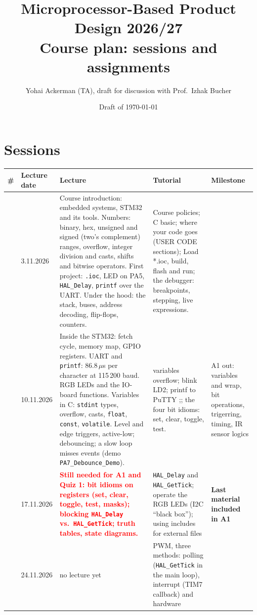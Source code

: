 \documentclass[11pt,a4paper]{article}
\title{Microprocessor-Based Product Design 2026/27\\[2pt]\large Course plan: sessions and assignments}
\author{Yohai Ackerman (TA), draft for discussion with Prof.\ Izhak Bucher}
\date{Draft of \today}
\begin{document}
\maketitle

\section{Sessions}

\noindent
\begin{xltabular}{\textwidth}{@{}c l L L >{\raggedright\arraybackslash{}}p{2.3cm}@{}}
\toprule
\# & Lecture date & Lecture & Tutorial & Milestone \\
\midrule
\endhead
\bottomrule
{} & 3.11.2026 & Course introduction: embedded systems, STM32 and its tools. Numbers: binary, hex, unsigned and
    signed (two's complement) ranges, overflow, integer division and casts, shifts and bitwise operators. First
    project: \texttt{.ioc}, LED on PA5, \texttt{HAL\_Delay}, \texttt{printf} over the UART. Under the hood: the
    stack, buses, address decoding, flip-flops, counters.
  & Course policies; C basic; where your code goes (USER CODE sections); 
Load *.ioc, build, flash and run; the debugger: breakpoints, stepping, live expressions.
  & \\
 & 10.11.2026 & Inside the STM32: fetch cycle, memory map, GPIO registers. UART and \texttt{printf}: 86.8\,$\mu$s
    per character at 115\,200 baud. RGB LEDs and the IO-board functions. Variables in C: \texttt{stdint} types,
    overflow, casts, \texttt{float}, \texttt{const}, \texttt{volatile}. Level and edge triggers, active-low;
    debouncing; a slow loop misses events (demo \texttt{PA7\_Debounce\_Demo}).
  & variables overflow; blink LD2; printf to PuTTY ;; the four bit idioms: set, clear, toggle, test.
  & A1 out: variables and wrap, bit operations, trigerring, timing, IR sensor logics \\
 & 17.11.2026 & \textcolor{red}{\bfseries Still needed for A1 and Quiz 1: bit idioms on registers (set, clear,
    toggle, test, masks); blocking \texttt{HAL\_Delay} vs.\ \texttt{HAL\_GetTick}; truth tables, state diagrams.}
  & \texttt{HAL\_Delay} and \texttt{HAL\_GetTick}; operate the RGB LEDs (I2C “black box”); using includes for external
    files
  & \textbf{Last material included in A1} \\
 & 24.11.2026 & no lecture yet
  & PWM, three methods: polling (\texttt{HAL\_GetTick} in the main loop), interrupt (TIM7 callback) and hardware

\end{xltabular}
\end{document}
